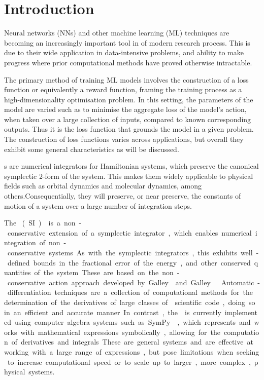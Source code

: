 \section{Introduction}

Neural networks (NNs) and other machine learning (ML) techniques are becoming an increasingly important tool in of modern research process. This is due to their wide application in data-intensive problems, and ability to make progress where prior computational methods have proved otherwise intractable.

The primary method of training ML models involves the construction of a loss function or equivalently a reward function, framing the training process as a high-dimensionality optimisation problem.
In this setting, the parameters of the model are varied such as to minimise the aggregate loss of the model's action, when taken over a large collection of inputs, compared to known corresponding outputs.
Thus it is the loss function that grounds the model in a given problem.
The construction of loss functions varies across applications, but overall they exhibit some general characteristics as will be discussed.

\SymI{}s are numerical integrators for Hamiltonian systems, which preserve the canonical symplectic 2-form of the system. 
This makes them widely applicable to physical fields such as orbital dynamics and  molecular dynamics, among others\cite{gladmanSymplecticIntegratorsLongterm1991,wisdomSymplecticMapsNbody1991}.Consequentially, they will preserve, or near preserve, the constants of motion of a system over a large number of integration steps.

The \SI{} (SI)\cite{tsangSLIMPLECTICINTEGRATORSVARIATIONAL2015} is a non-conservative extension of a symplectic integrator, which enables numerical integration of non-conservative systems. As with the symplectic integrators, this exhibits well-defined bounds in the fractional error of the energy, and other conserved quantities of the system. These are based on the non-conservative action approach developed by Galley \cite{galleyClassicalMechanicsNonconservative2013} and Galley \etall \cite{galleyPrincipleStationaryNonconservative2014}.

Automatic-differentiation techniques are a collection of computational methods for the determination of the derivatives of large classes of scientific code, doing so in an efficient and accurate manner. In contrast, the \SI{} is currently implemented using computer algebra systems such as SymPy \cite{sympy}, which represents and works with mathematical expressions symbolically, allowing for the computation of derivatives and integrals. These are general systems and are effective at working with a large range of expressions, but pose limitations when seeking to increase computational speed or to scale up to larger, more complex, physical systems.

